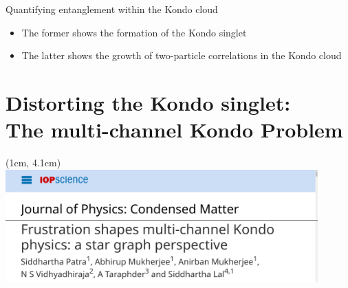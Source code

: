 \documentclass[10pt,aspectratio=169]{beamer}
\begin{document}
\begin{frame}{Quantifying entanglement within the Kondo cloud}
{\vspace*{\fill}
\begin{itemize}
	\item The former shows the formation of the \alert{Kondo singlet}\\[10pt]
	\item The latter shows the growth of two-particle correlations in the \alert{Kondo cloud}
\end{itemize}
}
\end{frame}

\section{Distorting the Kondo singlet:\\ The multi-channel Kondo Problem}
\begin{textblock*}{\textwidth}(1cm, 4.1cm)
\includegraphics[width=0.9\textwidth]{MCKJPCM.pdf}
\end{textblock*}
\subsection{~}
\end{document}
